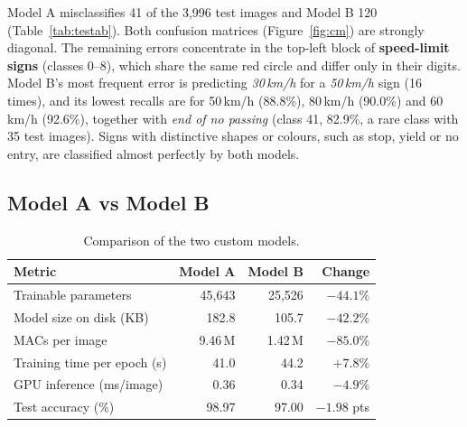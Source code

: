 \documentclass[11pt, a4paper]{article}
\begin{document}
Model A misclassifies 41 of the 3,996 test images and Model B 120 (Table~\ref{tab:testab}). Both confusion matrices
(Figure~\ref{fig:cm}) are strongly diagonal. The remaining errors concentrate in the top-left block of
\textbf{speed-limit signs} (classes 0--8), which share the same red circle and differ only in their digits. Model B's
most frequent error is predicting \emph{30\,km/h} for a \emph{50\,km/h} sign (16 times), and its lowest recalls are
for 50\,km/h (88.8\%), 80\,km/h (90.0\%) and 60\,km/h (92.6\%), together with \emph{end of no passing}
(class 41, 82.9\%, a rare class with 35 test images). Signs with distinctive shapes or colours, such as stop, yield
or no entry, are classified almost perfectly by both models.

\subsection{Model A vs Model B}

\begin{table}[H]
\centering
\caption{Comparison of the two custom models.}
\label{tab:ab}
\begin{tabular}{lrrr}
\toprule
\textbf{Metric} & \textbf{Model A} & \textbf{Model B} & \textbf{Change} \\
\midrule
Trainable parameters             & 45,643     & 25,526     & $-44.1\%$ \\
Model size on disk (KB)          & 182.8      & 105.7      & $-42.2\%$ \\
MACs per image                   & 9.46\,M    & 1.42\,M    & $-85.0\%$ \\
Training time per epoch (s)      & 41.0       & 44.2       & $+7.8\%$ \\
GPU inference (ms/image)         & 0.36       & 0.34       & $-4.9\%$ \\
Test accuracy (\%)               & 98.97      & 97.00      & $-1.98$ pts \\
\bottomrule
\end{tabular}
\end{table}
\end{document}
